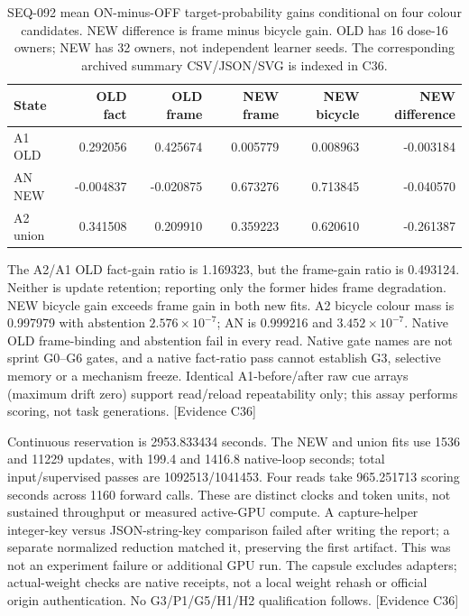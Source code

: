 \documentclass[11pt]{article}
\newcommand{\ev}[1]{\textsf{[Evidence #1]}}
\begin{document}
\begin{table}[htbp]
\centering
\small
\begin{tabular}{lrrrrr}
\toprule
State & OLD fact & OLD frame & NEW frame & NEW bicycle & NEW difference \\
\midrule
A1 OLD & 0.292056 & 0.425674 & 0.005779 & 0.008963 & -0.003184 \\
AN NEW & -0.004837 & -0.020875 & 0.673276 & 0.713845 & -0.040570 \\
A2 union & 0.341508 & 0.209910 & 0.359223 & 0.620610 & -0.261387 \\
\bottomrule
\end{tabular}
\caption{SEQ-092 mean ON-minus-OFF target-probability gains conditional on
four colour candidates. NEW difference is frame minus bicycle gain.
OLD has 16 dose-16 owners; NEW has 32 owners, not independent learner seeds.
The corresponding archived summary CSV/JSON/SVG is indexed in C36.}
\label{tab:cumulative092}
\end{table}

The A2/A1 OLD fact-gain ratio is 1.169323, but the frame-gain ratio is 0.493124.
Neither is update retention; reporting only the former hides frame degradation.
NEW bicycle gain exceeds frame gain in both new fits. A2 bicycle colour mass is
0.997979 with abstention $2.576\times10^{-7}$; AN is 0.999216 and
$3.452\times10^{-7}$. Native OLD frame-binding and abstention fail in every
read. Native gate names are not sprint G0--G6 gates, and a native fact-ratio
pass cannot establish G3, selective memory or a mechanism freeze. Identical
A1-before/after raw cue arrays (maximum drift zero) support read/reload
repeatability only; this assay performs scoring, not task generations. \ev{C36}

Continuous reservation is 2953.833434 seconds. The NEW and union fits use
1536 and 11229 updates, with 199.4 and 1416.8 native-loop seconds; total
input/supervised passes are 1092513/1041453. Four reads take 965.251713 scoring
seconds across 1160 forward calls. These are distinct clocks and token units,
not sustained throughput or measured active-GPU compute. A capture-helper
integer-key versus JSON-string-key comparison failed after writing the report;
a separate normalized reduction matched it, preserving the first artifact.
This was not an experiment failure or additional GPU run. The capsule excludes
adapters; actual-weight checks are native receipts, not a local weight rehash
or official origin authentication. No G3/P1/G5/H1/H2 qualification follows. \ev{C36}
\end{document}
